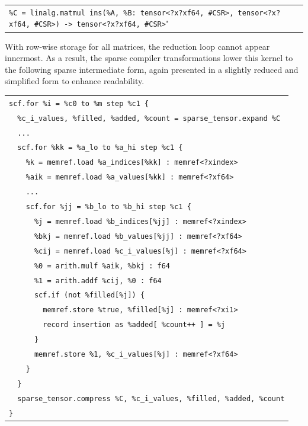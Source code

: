\documentclass[10pt]{article}
\newcommand{\exam}{\begin{flushleft}\scriptsize\begin{tabular}{l}}
\newcommand{\maxe}{\end{tabular}\end{flushleft}}
\begin{document}
\exam
\verb"%C = linalg.matmul ins(%A, %B: tensor<?x?xf64, #CSR>, tensor<?x?xf64, #CSR>) -> tensor<?x?xf64, #CSR>"
\maxe

With row-wise storage for all matrices, the reduction loop cannot appear innermost. As a result, the sparse compiler transformations lower this kernel to the following sparse intermediate form, again presented in a slightly reduced and simplified form to enhance readability.

\exam
\verb"scf.for %i = %c0 to %m step %c1 {" \\
\verb"  %c_i_values, %filled, %added, %count = sparse_tensor.expand %C" \\
\verb"  ..." \\
\verb"  scf.for %kk = %a_lo to %a_hi step %c1 {" \\
\verb"    %k = memref.load %a_indices[%kk] : memref<?xindex>" \\
\verb"    %aik = memref.load %a_values[%kk] : memref<?xf64>" \\
\verb"    ..." \\
\verb"    scf.for %jj = %b_lo to %b_hi step %c1 {" \\
\verb"      %j = memref.load %b_indices[%jj] : memref<?xindex>" \\
\verb"      %bkj = memref.load %b_values[%jj] : memref<?xf64>" \\
\verb"      %cij = memref.load %c_i_values[%j] : memref<?xf64>" \\
\verb"      %0 = arith.mulf %aik, %bkj : f64" \\
\verb"      %1 = arith.addf %cij, %0 : f64" \\
\verb"      scf.if (not %filled[%j]) {" \\
\verb"        memref.store %true, %filled[%j] : memref<?xi1>" \\
\verb"        record insertion as %added[ %count++ ] = %j" \\
\verb"      }" \\
\verb"      memref.store %1, %c_i_values[%j] : memref<?xf64>" \\
\verb"    }" \\
\verb"  }" \\
\verb"  sparse_tensor.compress %C, %c_i_values, %filled, %added, %count" \\ 
\verb"}" \\
\maxe
\end{document}

